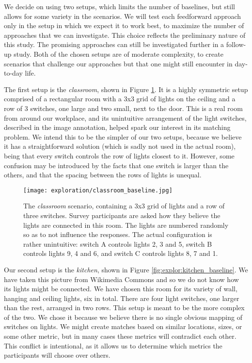 We decide on using two setups, which limits the number of baselines, but still allows for some variety in the scenarios. We will test each feedforward approach only in the setup in which we expect it to work best, to maximize the number of approaches that we can investigate. This choice reflects the preliminary nature of this study. The promising approaches can still be investigated further in a follow-up study. Both of the chosen setups are of moderate complexity, to create scenarios that challenge our approaches but that one might still encounter in day-to-day life.

The first setup is the \textit{classroom}, shown in Figure \ref{fig:explor:classroom_baseline}. It is a highly symmetric setup comprised of a rectangular room with a 3x3 grid of lights on the ceiling and a row of 3 switches, one large and two small, next to the door. This is a real room from around our workplace, and its unintuitive arrangement of the light switches, described in the image annotation, helped spark our interest in its matching problem. We intend this to be the simpler of our two setups, because we believe it has a straightforward solution (which is sadly not used in the actual room), being that every switch controls the row of lights closest to it. However, some confusion may be introduced by the facts that one switch is larger than the others, and that the spacing between the rows of lights is unequal.
    
\begin{figure}
    \centering
    \texttt{[image: exploration/classroom\_baseline.jpg]}
    \caption{The \textit{classroom} scenario, containing a 3x3 grid of lights and a row of three switches. Survey participants are asked how they believe the lights are connected in this room. The lights are numbered randomly so as to not influence the responses. The actual configuration is rather unintuitive: switch A controls lights 2, 3 and 5, switch B controls lights 9, 4 and 6, and switch C controls lights 8, 7 and 1.}
    \label{fig:explor:classroom_baseline}
\end{figure}

Our second setup is the \textit{kitchen}, shown in Figure \ref{fig:explor:kitchen_baseline}. We have taken this picture from Wikimedia Commons \cite{FileTROY82:online} and so we do not know how its lights might be connected. We have chosen this room for its variety of wall, hanging and ceiling lights, six in total. There are four light switches, one larger than the rest, arranged in two rows. This setup is meant to be the more complex of the two. We chose it because we believe there is no single obvious mapping of switches on lights. We might create matches based on similar locations, sizes, or some other metric, but in many cases these metrics will contradict each other. This conflict is intentional, as it allows us to determine which metrics the participants will choose over others.

